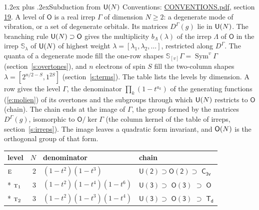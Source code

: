 \documentclass[10pt,a4paper]{article}
\makeatletter
\renewcommand\section{\@startsection{section}{1}{\z@}{-3ex plus -1ex minus -.2ex}%
  {1.2ex plus .2ex}{\normalfont\large\sffamily\bfseries\color{parttitle}}}
\def\grouprule#1#2{\noalign{\marks\LTgroupmarks{\the\belowrulesep}\nobreak\vskip#1%
  \vskip\aboverulesep}\multispan\LT@cols\unskip{\leaders\hrule\@height#2\hfill\kern\z@}\cr
  \noalign{\penalty\LTrulebreak\vskip\belowrulesep\global\@lastruleclass\z@}}
\numberwithin{equation}{section}
\newcommand{\grp}[1]{\mathsf{#1}}
\newcommand{\irr}[1]{\text{\normalfont\scshape #1}}
\newcommand{\repD}[1]{D^{#1}}
\newcommand{\schur}[1]{\mathbb{S}_{#1}}
\newcommand{\shape}[1]{[#1]}
\makeatother
\begin{document}
\section{Subduction from \texorpdfstring{$\grp{U(\mathnormal{N})}$}{U(N)}}\label{s:unitary}
Conventions: \href{../../CONVENTIONS.pdf}{CONVENTIONS.pdf}, section \href{../../CONVENTIONS.pdf\#conv.19}{19}.
\leavevmode\label{n:local.level.dimension}A level of $\grp{O}$ is a real irrep $\Gamma$ of dimension $N \ge 2$: a degenerate mode of vibration, or a set of degenerate orbitals. \label{n:group.unitary}Its matrices $\repD{\Gamma}(g)$ lie in $\grp{U(\mathnormal{N})}$. \label{n:irrep.schur}\label{n:shape.partition}\label{n:local.partition}\label{n:function.multiplicity.unitary}The branching rule $\grp{U(\mathnormal{N})} \supset \grp{O}$ gives the multiplicity $b_\Lambda(\lambda)$ of the irrep $\Lambda$ of $\grp{O}$ in the irrep $\schur{\lambda}$ of $\grp{U(\mathnormal{N})}$ of highest weight $\lambda = \shape{\lambda_1, \lambda_2, \dots}$, restricted along $\repD{\Gamma}$. \label{n:local.partition.power}\label{n:local.electrons}\label{n:local.spin}The quanta of a degenerate mode fill the one-row shapes $\schur{\shape{v}}\Gamma = \operatorname{Sym}^{v}\Gamma$ (section~\ref{s:overtones}), and $n$ electrons of spin $S$ fill the two-column shapes $\lambda = \shape{2^{n/2-S}, 1^{2S}}$ (section~\ref{s:terms}).
The table lists the levels by dimension. \label{n:head.level}\label{n:head.denominator}\label{n:index.overtone.denominator}\label{n:head.chain}A row gives the level $\Gamma$, the denominator $\prod_k (1 - t^{a_k})$ of the generating functions (\ref{e:molien}) of its overtones and the subgroups through which $\grp{U(\mathnormal{N})}$ restricts to $\grp{O}$ (chain). The chain ends at the image of $\Gamma$, the group formed by the matrices $\repD{\Gamma}(g)$, isomorphic to $\grp{O}/\ker\Gamma$ (the column kernel of the table of irreps, section~\ref{s:irreps}). The image leaves a quadratic form invariant, and $\grp{O(\mathnormal{N})}$ is the orthogonal group of that form.
{\small\begin{longtable}{@{}lrll@{}}\toprule
level & $N$ & denominator & chain\\\midrule\endhead
\bottomrule\endfoot\endlastfoot
$\irr{e}$ & 2 & $(1-t^{2})(1-t^{3})$ & $\grp{U(2)} \supset \grp{O(2)} \supset$ \href{C3v.pdf}{$\grp{C_{3v}}$}\\*
\grouprule{0pt}{\lightrulewidth}
$\irr{t}_{1}$ & 3 & $(1-t^{2})(1-t^{4})(1-t^{6})$ & $\grp{U(3)} \supset$ \href{O3.pdf}{$\grp{O(3)}$} $\supset$ \href{O.pdf}{$\grp{O}$}\\*
$\irr{t}_{2}$ & 3 & $(1-t^{2})(1-t^{3})(1-t^{4})$ & $\grp{U(3)} \supset$ \href{O3.pdf}{$\grp{O(3)}$} $\supset$ \href{Td.pdf}{$\grp{T_{d}}$}\\
\bottomrule\end{longtable}}
\end{document}

